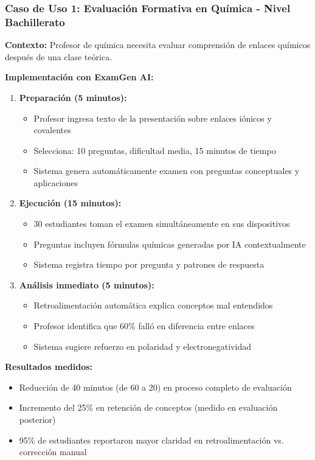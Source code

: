 \documentclass[12pt,a4paper]{report}
\begin{document}
\subsubsection{Caso de Uso 1: Evaluación Formativa en Química - Nivel Bachillerato}

\textbf{Contexto:} Profesor de química necesita evaluar comprensión de enlaces químicos después de una clase teórica.

\textbf{Implementación con ExamGen AI:}
\begin{enumerate}
\item \textbf{Preparación (5 minutos):}
   \begin{itemize}
   \item Profesor ingresa texto de la presentación sobre enlaces iónicos y covalentes
   \item Selecciona: 10 preguntas, dificultad media, 15 minutos de tiempo
   \item Sistema genera automáticamente examen con preguntas conceptuales y aplicaciones
   \end{itemize}

\item \textbf{Ejecución (15 minutos):}
   \begin{itemize}
   \item 30 estudiantes toman el examen simultáneamente en sus dispositivos
   \item Preguntas incluyen fórmulas químicas generadas por IA contextualmente
   \item Sistema registra tiempo por pregunta y patrones de respuesta
   \end{itemize}

\item \textbf{Análisis inmediato (5 minutos):}
   \begin{itemize}
   \item Retroalimentación automática explica conceptos mal entendidos
   \item Profesor identifica que 60\% falló en diferencia entre enlaces
   \item Sistema sugiere refuerzo en polaridad y electronegatividad
   \end{itemize}
\end{enumerate}

\textbf{Resultados medidos:}
\begin{itemize}
\item Reducción de 40 minutos (de 60 a 20) en proceso completo de evaluación
\item Incremento del 25\% en retención de conceptos (medido en evaluación posterior)
\item 95\% de estudiantes reportaron mayor claridad en retroalimentación vs. corrección manual
\end{itemize}
\end{document}
